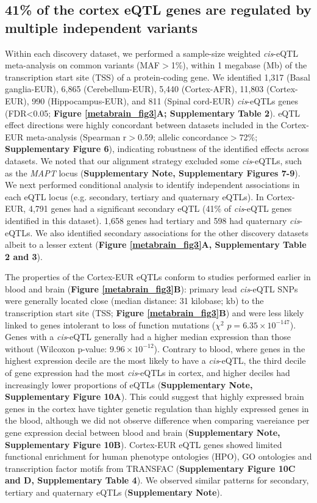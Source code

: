 \subsection{41\% of the cortex eQTL genes are regulated by multiple independent variants}
Within each discovery dataset, we performed a sample-size weighted \textit{cis}-eQTL meta-analysis on common variants (MAF$>$1\%), within 1 megabase (Mb) of the transcription start site (TSS) of a protein-coding gene. We identified 1,317 (Basal ganglia-EUR), 6,865 (Cerebellum-EUR), 5,440 (Cortex-AFR), 11,803 (Cortex-EUR), 990 (Hippocampus-EUR), and 811 (Spinal cord-EUR) \textit{cis}-eQTLs genes (FDR<0.05; \textbf{Figure \ref{metabrain_fig3}A; Supplementary Table 2}). eQTL effect directions were highly concordant between datasets included in the Cortex-EUR meta-analysis (Spearman r$>$0.59; allelic concordance$>$72\%; \textbf{Supplementary Figure 6}), indicating robustness of the identified effects across datasets. We noted that our alignment strategy excluded some \textit{cis}-eQTLs, such as the \textit{MAPT} locus (\textbf{Supplementary Note, Supplementary Figures 7-9}). We next performed conditional analysis to identify independent associations in each eQTL locus (e.g. secondary, tertiary and quaternary eQTLs). In Cortex-EUR, 4,791 genes had a significant secondary eQTL (41\% of \textit{cis}-eQTL genes identified in this dataset). 1,658 genes had tertiary and 598 had quaternary \textit{cis}-eQTLs. We also identified secondary associations for the other discovery datasets albeit to a lesser extent (\textbf{Figure \ref{metabrain_fig3}A, Supplementary Table 2 and 3}).  

The properties of the Cortex-EUR eQTLs conform to studies performed earlier in blood\cite{vosaUnravelingPolygenicArchitecture2018} and brain\cite{dobbynLandscapeConditionalEQTL2018} (\textbf{Figure \ref{metabrain_fig3}B}): primary lead \textit{cis}-eQTL SNPs were generally located close (median distance: 31 kilobase; kb) to the transcription start site (TSS; \textbf{Figure \ref{metabrain_fig3}B}) and were less likely linked to genes intolerant to loss of function mutations ($\chi^2$ $p = 6.35 \times 10^{-147}$). Genes with a \textit{cis}-eQTL generally had a higher median expression than those without (Wilcoxon p-value: $9.96 \times 10^{-12}$). Contrary to blood, where genes in the highest expression decile are the most likely to have a \textit{cis}-eQTL, the third decile of gene expression had the most \textit{cis}-eQTLs in cortex, and higher deciles had increasingly lower proportions of eQTLs (\textbf{Supplementary Note, Supplementary Figure 10A}). This could suggest that highly expressed brain genes in the cortex have tighter genetic regulation than highly expressed genes in the blood, although we did not observe difference when comparing vaereiance per gene expression decial between blood and brain (\textbf{Supplementary Note, Supplementary Figure 10B}). Cortex-EUR eQTL genes showed limited functional enrichment for human phenotype ontologies (HPO), GO ontologies and transcription factor motifs from TRANSFAC\cite{wingenderTRANSFACDatabaseTranscription1996} (\textbf{Supplementary Figure 10C and D, Supplementary Table 4}). We observed similar patterns for secondary, tertiary and quaternary eQTLs (\textbf{Supplementary Note}). 

